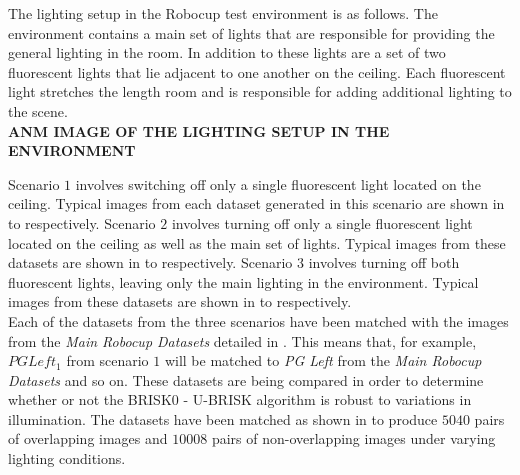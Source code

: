 \documentclass[11pt]{report}
\begin{document}
The lighting setup in the Robocup test environment is as follows. The environment contains a main set of lights that are responsible for providing the general lighting in the room. In addition to these lights are a set of two fluorescent lights that lie adjacent to one another on the ceiling. Each fluorescent light stretches the length room and is responsible for adding additional lighting to the scene. \\

\textbf{ANM IMAGE OF THE LIGHTING SETUP IN THE ENVIRONMENT}

Scenario $1$ involves switching off only a single fluorescent light located on the ceiling. Typical images from each dataset generated in this scenario are shown in  to  respectively. Scenario $2$ involves turning off only a single fluorescent light located on the ceiling as well as the main set of lights. Typical images from these datasets are shown in  to  respectively. Scenario $3$ involves turning off both fluorescent lights, leaving only the main lighting in the environment. Typical images from these datasets are shown in  to  respectively. \\

Each of the datasets from the three scenarios have been matched with the images from the \textit{Main Robocup Datasets} detailed in . This means that, for example, \textit{$PG Left_1$} from scenario $1$ will be matched to \textit{PG Left} from the \textit{Main Robocup Datasets} and so on. These datasets are being compared in order to determine whether or not the BRISK0 - U-BRISK algorithm is robust to variations in illumination. The datasets have been matched as shown in  to produce $5040$ pairs of overlapping images and $10008$ pairs of non-overlapping images under varying lighting conditions.\\
\end{document}
